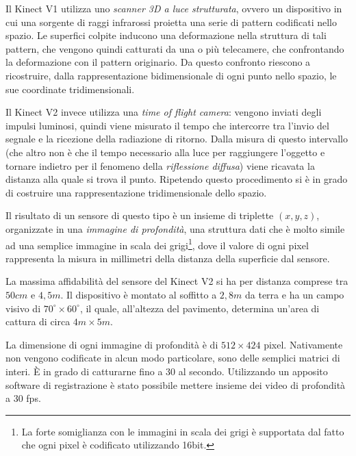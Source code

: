 Il Kinect V1 utilizza uno \emph{scanner 3D a luce strutturata}, ovvero un dispositivo in cui una sorgente di raggi infrarossi proietta una serie di pattern codificati nello spazio.
Le superfici colpite inducono una deformazione nella struttura di tali pattern, che vengono quindi catturati da una o più telecamere, che confrontando la deformazione con il pattern originario.
Da questo confronto riescono a ricostruire, dalla rappresentazione bidimensionale di ogni punto nello spazio, le sue coordinate tridimensionali.

Il Kinect V2 invece utilizza una \emph{time of flight camera}: vengono inviati degli impulsi luminosi, quindi viene misurato il tempo che intercorre tra l'invio del segnale e la ricezione della radiazione di ritorno.
Dalla misura di questo intervallo (che altro non è che il tempo necessario alla luce per raggiungere l'oggetto e tornare indietro per il fenomeno della \emph{riflessione diffusa}) viene ricavata la distanza alla quale si trova il punto. 
Ripetendo questo procedimento si è in grado di costruire una rappresentazione tridimensionale dello spazio.

Il risultato di un sensore di questo tipo è un insieme di triplette $(x,y,z)$, organizzate in una \emph{immagine di profondità}, una struttura dati che è molto simile ad una semplice immagine in scala dei grigi\footnote{La forte somiglianza con le immagini in scala dei grigi è supportata dal fatto che ogni pixel è codificato utilizzando 16bit.}, dove il valore di ogni pixel rappresenta la misura in millimetri della distanza della superficie dal sensore.

La massima affidabilità del sensore del Kinect V2 si ha per distanza comprese tra $50cm$ e $4,5m$.
Il dispositivo è montato al soffitto a $2,8m$ da terra e ha un campo visivo di $70^{\circ} \times 60^{\circ}$, il quale, all'altezza del pavimento, determina un'area di cattura di circa $4m \times 5m$.

La dimensione di ogni immagine di profondità è di $512 \times 424$ pixel. 
Nativamente non vengono codificate in alcun modo particolare, sono delle semplici matrici di interi.
È in grado di catturarne fino a 30 al secondo. 
Utilizzando un apposito software di registrazione è stato possibile mettere insieme dei video di profondità a 30 fps.

